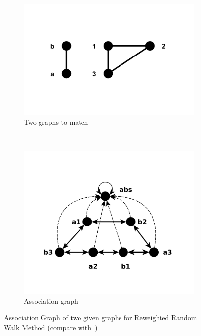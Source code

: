 \begin{figure}[h] %
	\centering
	\begin{subfigure}[b]{0.33\textwidth}
		\includegraphics[width=\textwidth]{chapter1/fig/RRWM1}
		\caption{Two graphs to match}
		\label{fig:RRWM1} 
	\end{subfigure}
	~
	\begin{subfigure}[b]{0.33\textwidth}
		\includegraphics[width=\textwidth]{chapter1/fig/RRWM2}
		\caption{Association graph}
		\label{fig:RRWM2} 
	\end{subfigure}   
	\caption[Association graph in Reweighted Random Walk Method]{Association Graph of two given graphs for Reweighted Random Walk Method (compare with~\cite{Cho2010_RRWM})}
\end{figure}
